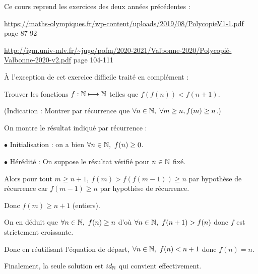 \author{Matthieu Bouyer}
Ce cours reprend les exercices des deux années précédentes :

\url{https://maths-olympiques.fr/wp-content/uploads/2019/08/PolycopieV1-1.pdf}
page 87-92

\url{http://igm.univ-mlv.fr/~juge/pofm/2020-2021/Valbonne-2020/Polycopié-Valbonne-2020-v2.pdf}
page 104-111

À l'exception de cet exercice difficile traité en complément :

\begin{exo}
Trouver les fonctions $f : \mathbb N\longmapsto\mathbb N$ telles que $f(f(n))<f(n+1)$.

(Indication : Montrer par récurrence que $\forall n\in\mathbb N,~\forall m\ge n, f(m)\ge n$.)
\end{exo}

\begin{sol}
On montre le résultat indiqué par récurrence :

$\bullet$ Initialisation : on a bien $\forall n\in\mathbb N,~f(n)\ge0$.

$\bullet$ Hérédité : On suppose le résultat vérifié pour $n\in\mathbb N$ fixé.

Alors pour tout $m\ge n+1,~f(m)>f(f(m-1))\ge n$ par hypothèse de récurrence car $f(m-1)\ge n$ par hypothèse de récurrence.

Donc $f(m)\ge n+1$ (entiers).

\bigskip

On en déduit que $\forall n\in\mathbb N,~f(n)\ge n$ d'où $\forall n\in\mathbb N,~f(n+1)>f(n)$ donc $f$ est strictement croissante.

Donc en réutilisant l'équation de départ, $\forall n\in\mathbb N,~f(n)<n+1$ donc $f(n)=n$.

Finalement, la seule solution est $id_\mathbb N$ qui convient effectivement.
\end{sol}


